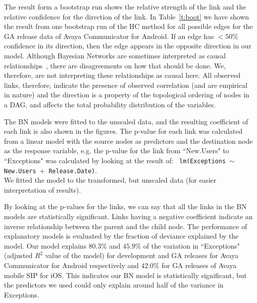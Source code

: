 \documentclass[smallcondensed]{svjour3}     %
\begin{document}
The result form a bootstrap run shows the relative strength of the
link and the relative confidence for the direction of the link. 
In Table~\ref{t:boot} we have shown the result from one bootstrap run of the HC method for all possible edges for the GA release data of Avaya Communicator for Android. If an edge has $<50\%$ confidence in its direction, then the edge appears in the opposite direction in our model.
Although Bayesian Networks are sometimes interpreted as causal relationships~\cite{pearl2011bayesian}, there are disagreements on how that should be done.
We, therefore, are not interpreting these relationships as causal here. All observed links, therefore, indicate the presence of observed correlation (and are empirical in nature) and the direction is a property of the topological ordering of nodes in a DAG, and affects the total probability distribution of the variables.

The BN models were fitted to
the unscaled data, and the resulting coefficient of each link is also shown
in the figures. The p-value for each link was calculated from a
linear model with the source nodes as predictors and the destination
node as the response variable, e.g. the p-value for the link from
``New.Users" to ``Exceptions" was calculated by looking at the
result of:  \texttt{  lm(Exceptions $\sim$ New.Users $+$ Release.Date)}. \\
We fitted the model to the transformed, but unscaled data (for easier interpretation of results). 

By looking at the p-values for the links, we can say that all the links in the BN models
are statistically significant. 
Links having a negative coefficient indicate an inverse relationship between the parent 
and the child node. The performance of explanatory models is evaluated by the fraction
of deviance explained by the model. Our model explains $80.3\%$ and $45.9\%$ of the
variation in ``Exceptions" (adjusted $R^2$ value of the model) for development and GA releases for Avaya Communicator for Android respectively and $42.0\%$ for GA releases of Avaya mobile SIP for iOS. This indicates our BN model is statistically significant, but the predictors we used could only explain around half of the variance in Exceptions.


\vspace{-10pt}
\end{document}
